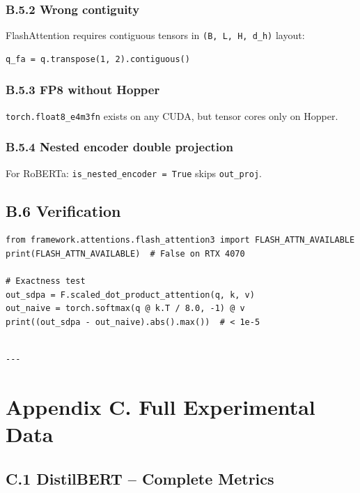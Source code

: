 \subsubsection{B.5.2 Wrong contiguity}
FlashAttention requires contiguous tensors in \texttt{(B, L, H, d\_h)} layout:
\begin{lstlisting}
q_fa = q.transpose(1, 2).contiguous()
\end{lstlisting}

\subsubsection{B.5.3 FP8 without Hopper}
\texttt{torch.float8\_e4m3fn} exists on any CUDA, but tensor cores only on Hopper.

\subsubsection{B.5.4 Nested encoder double projection}
For RoBERTa: \texttt{is\_nested\_encoder = True} skips \texttt{out\_proj}.

\subsection{B.6 Verification}

\begin{lstlisting}
from framework.attentions.flash_attention3 import FLASH_ATTN_AVAILABLE
print(FLASH_ATTN_AVAILABLE)  # False on RTX 4070

# Exactness test
out_sdpa = F.scaled_dot_product_attention(q, k, v)
out_naive = torch.softmax(q @ k.T / 8.0, -1) @ v
print((out_sdpa - out_naive).abs().max())  # < 1e-5
\end{lstlisting}
\begin{lstlisting}

---
\end{lstlisting}

\section{Appendix C. Full Experimental Data}

\subsection{C.1 DistilBERT -- Complete Metrics}

